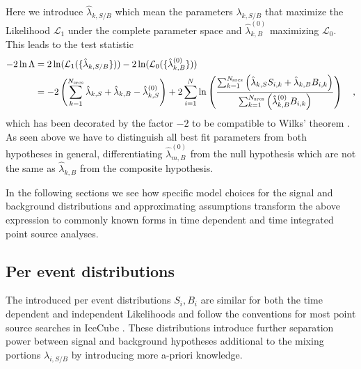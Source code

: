 Here we introduce $\hat{\lambda}_{k,S/B}$ which mean the parameters $\lambda_{k,S/B}$ that maximize the Likelihood $\mathcal{L}_1$ under the complete parameter space and $\hat{\lambda}_{k,B}^{(0)}$ maximizing $\mathcal{L}_0$.
This leads to the test statistic
\begin{equation}
  \begin{aligned}
    -2\ln\Lambda
    &= 2\ln(\mathcal{L}_1(\{\hat{\lambda}_{k,S/B}\})) -
       2\ln(\mathcal{L}_0(\{\hat{\lambda}^{(0)}_{k,B}\})) \\
    &= -2\left(\sum_{k=1}^{N_\text{srcs}}\hat{\lambda}_{k,S} +
                                         \hat{\lambda}_{k,B} -
                                         \hat{\lambda}_{k,S}^{(0)}\right) +
      2\sum_{i=1}^N \ln\left(
        \frac{\sum_{k=1}^{N_\text{srcs}}\left(
            \hat{\lambda}_{k,S} S_{i,k}+\hat{\lambda}_{k,B} B_{i,k}\right)}
            {\sum_{k=1}^{N_\text{srcs}}\left(
              \hat{\lambda}_{k,B}^{(0)} B_{i,k}
            \right)}
          \right)
    \quad\text{,}
  \end{aligned}
\end{equation}
which has been decorated by the factor $-2$ to be compatible to Wilks' theorem .
As seen above we have to distinguish all best fit parameters from both hypotheses in general, differentiating $\hat{\lambda}_{m,B}^{(0)}$ from the null hypothesis which are not the same as $\hat{\lambda}_{k,B}$ from the composite hypothesis.

In the following sections we see how specific model choices for the signal and background distributions and approximating assumptions transform the above expression to commonly known forms in time dependent and time integrated point source analyses.

\subsection{Per event distributions}
The introduced per event distributions $S_i, B_i$ are similar for both the time dependent and independent Likelihoods and follow the conventions for most point source searches in IceCube .
These distributions introduce further separation power between signal and background hypotheses additional to the mixing portions $\lambda_{i,S/B}$ by introducing more a-priori knowledge.


